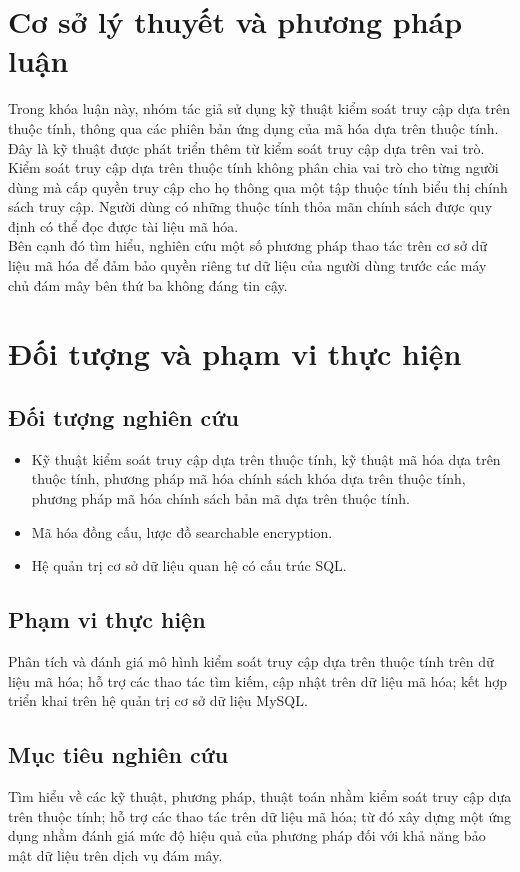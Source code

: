 \section{Cơ sở lý thuyết và phương pháp luận}
Trong khóa luận này, nhóm tác giả sử dụng kỹ thuật kiểm soát truy cập dựa trên
thuộc tính, thông qua các phiên bản ứng dụng của mã hóa dựa trên thuộc tính. Đây là kỹ
thuật được phát triển thêm từ kiểm soát truy cập dựa trên vai trò. Kiểm soát truy cập dựa
trên thuộc tính không phân chia vai trò cho từng người dùng mà cấp quyền truy cập cho
họ thông qua một tập thuộc tính biểu thị chính sách truy cập. Người dùng có những thuộc
tính thỏa mãn chính sách được quy định có thể đọc được tài liệu mã hóa. \\
\indent Bên cạnh đó tìm hiểu, nghiên cứu một số phương pháp thao tác trên cơ sở dữ liệu
mã hóa để đảm bảo quyền riêng tư dữ liệu của người dùng trước các máy chủ đám mây
bên thứ ba không đáng tin cậy.
\section{Đối tượng và phạm vi thực hiện}
\subsection{Đối tượng nghiên cứu}
\begin{itemize}
    \item Kỹ thuật kiểm soát truy cập dựa trên thuộc tính, kỹ thuật mã hóa dựa trên thuộc tính, phương pháp mã hóa chính sách khóa dựa trên thuộc tính, phương pháp mã hóa chính sách bản mã dựa trên thuộc tính.
    \item Mã hóa đồng cấu, lược đồ searchable encryption.
    \item Hệ quản trị cơ sở dữ liệu quan hệ có cấu trúc SQL.
\end{itemize}
\subsection{Phạm vi thực hiện}
Phân tích và đánh giá mô hình kiểm soát truy cập dựa trên thuộc tính trên dữ liệu mã hóa; hỗ trợ các thao tác tìm kiếm, cập nhật trên dữ liệu mã hóa; kết hợp triển khai trên hệ quản trị cơ sở dữ liệu MySQL.
\subsection{Mục tiêu nghiên cứu}
Tìm hiểu về các kỹ thuật, phương pháp, thuật toán nhằm kiểm soát truy cập dựa trên thuộc tính; hỗ trợ các thao tác trên dữ liệu mã hóa; từ đó xây dựng một ứng dụng nhằm đánh giá mức độ hiệu quả của phương pháp đối với khả năng bảo mật dữ liệu trên dịch vụ đám mây.
